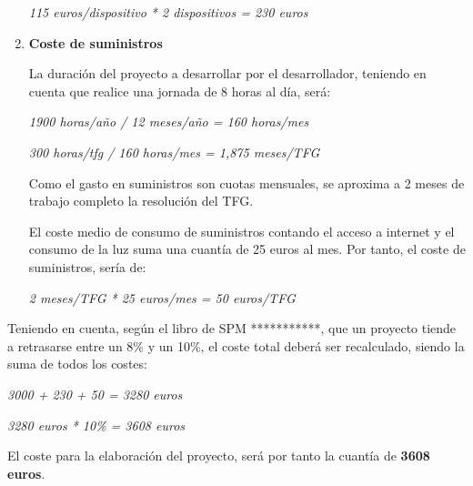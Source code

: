 \begin{enumerate}
\begin{center}
    \textit{115 euros/dispositivo * 2 dispositivos = 230 euros}
\end{center}

    \item \textbf{Coste de suministros}
    
    La duración del proyecto a desarrollar por el desarrollador, teniendo en cuenta que realice una jornada de 8 horas al día, será:
    
\begin{center}
    \textit{1900 horas/año / 12 meses/año = 160 horas/mes}
    
    \textit{300 horas/tfg / 160 horas/mes = 1,875 meses/TFG}
\end{center}

    Como el gasto en suministros son cuotas mensuales, se aproxima a 2 meses de trabajo completo la resolución del TFG.
    
    El coste medio de consumo de suministros contando el acceso a internet y el consumo de la luz suma una cuantía de 25 euros al mes. Por tanto, el coste de suministros, sería de:
\begin{center}
    \textit{2 meses/TFG * 25 euros/mes = 50 euros/TFG}
\end{center}
    
\end{enumerate}

Teniendo en cuenta, según el libro de SPM ***********, que un proyecto tiende a retrasarse entre un 8\% y un 10\%, el coste total deberá ser recalculado, siendo la suma de todos los costes:

\begin{center}
    \textit{3000 + 230 + 50 = 3280 euros}
    
    \textit{3280 euros * 10\%  = 3608 euros}
\end{center}

El coste para la elaboración del proyecto, será por tanto la cuantía de \textbf{3608 euros}.